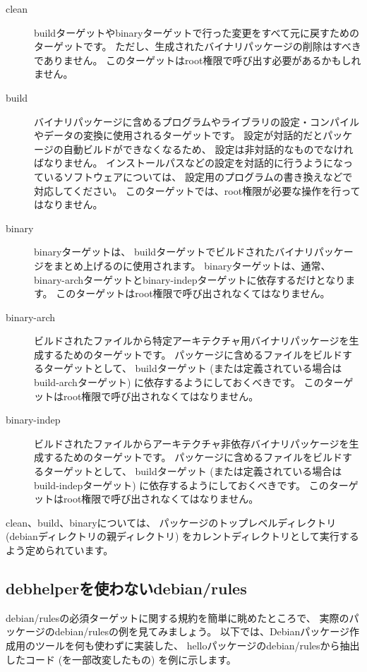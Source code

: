 \documentclass[mingoth,a4paper]{jsarticle}
\begin{document}
\begin{description}
 \item[clean]
    buildターゲットやbinaryターゲットで行った変更をすべて元に戻すためのターゲットです。
    ただし、生成されたバイナリパッケージの削除はすべきでありません。
    このターゲットはroot権限で呼び出す必要があるかもしれません。
 \item[build]
    バイナリパッケージに含めるプログラムやライブラリの設定・コンパイルやデータの変換に使用されるターゲットです。
    設定が対話的だとパッケージの自動ビルドができなくなるため、
    設定は非対話的なものでなければなりません。
    インストールパスなどの設定を対話的に行うようになっているソフトウェアについては、
    設定用のプログラムの書き換えなどで対応してください。
    このターゲットでは、root権限が必要な操作を行ってはなりません。
 \item[binary]
    binaryターゲットは、
    buildターゲットでビルドされたバイナリパッケージをまとめ上げるのに使用されます。
    binaryターゲットは、通常、
    binary-archターゲットとbinary-indepターゲットに依存するだけとなります。
    このターゲットはroot権限で呼び出されなくてはなりません。
 \item[binary-arch]
    ビルドされたファイルから特定アーキテクチャ用バイナリパッケージを生成するためのターゲットです。
    パッケージに含めるファイルをビルドするターゲットとして、
    buildターゲット (または定義されている場合はbuild-archターゲット) に依存するようにしておくべきです。
    このターゲットはroot権限で呼び出されなくてはなりません。
 \item[binary-indep]
    ビルドされたファイルからアーキテクチャ非依存バイナリパッケージを生成するためのターゲットです。
    パッケージに含めるファイルをビルドするターゲットとして、
    buildターゲット (または定義されている場合はbuild-indepターゲット) に依存するようにしておくべきです。
    このターゲットはroot権限で呼び出されなくてはなりません。
\end{description}

clean、build、binaryについては、
パッケージのトップレベルディレクトリ (debianディレクトリの親ディレクトリ) をカレントディレクトリとして実行するよう定められています。

\subsection{debhelperを使わないdebian/rules}

debian/rulesの必須ターゲットに関する規約を簡単に眺めたところで、
実際のパッケージのdebian/rulesの例を見てみましょう。
以下では、Debianパッケージ作成用のツールを何も使わずに実装した、
helloパッケージのdebian/rulesから抽出したコード (を一部改変したもの) を例に示します。
\end{document}
